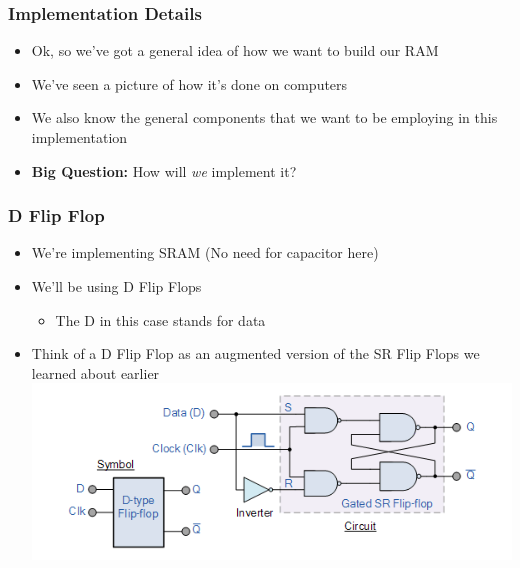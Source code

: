 \documentclass{beamer}
\begin{document}
        \begin{frame}
        		\frametitle{Implementation Details}
        		\begin{itemize}
        			\item Ok, so we've got a general idea of how we want to build our RAM
        			\item We've seen a picture of how it's done on computers
        			\item We also know the general components that we want to be employing in this implementation
        			\item \textbf{Big Question:} How will \textit{we} implement it?
        		\end{itemize}
        \end{frame}
        
        \begin{frame}
        		\frametitle{D Flip Flop}
        		\begin{itemize}
        			\item We're implementing SRAM (No need for capacitor here)
        			\item We'll be using D Flip Flops
        			\begin{itemize}
        				\item The D in this case stands for data
        			\end{itemize}
        			\item Think of a D Flip Flop as an augmented version of the SR Flip Flops we learned about earlier\\
        			\includegraphics[scale=0.5]{dflipflop} 
        		\end{itemize}
        \end{frame}
        
\end{document}
